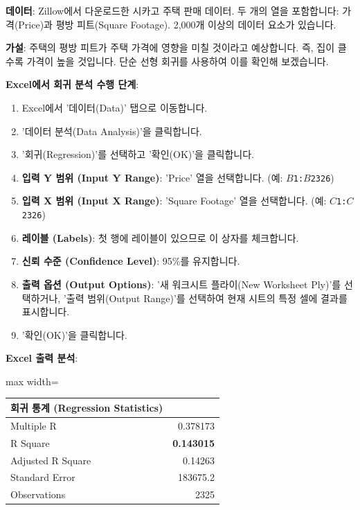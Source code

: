 \documentclass[11pt,a4paper]{article}
\theoremstyle{definition}
\begin{document}
\begin{tcolorbox}[examplebox, title=Excel 실습: Zillow 주택 데이터]
\textbf{데이터}: Zillow에서 다운로드한 시카고 주택 판매 데이터. 두 개의 열을 포함합니다: 가격(Price)과 평방 피트(Square Footage). 2,000개 이상의 데이터 요소가 있습니다.

\textbf{가설}: 주택의 평방 피트가 주택 가격에 영향을 미칠 것이라고 예상합니다. 즉, 집이 클수록 가격이 높을 것입니다. 단순 선형 회귀를 사용하여 이를 확인해 보겠습니다.

\textbf{Excel에서 회귀 분석 수행 단계}:
\begin{enumerate}[label=\arabic*.]
    \item Excel에서 '데이터(Data)' 탭으로 이동합니다.
    \item '데이터 분석(Data Analysis)'을 클릭합니다.
    \item '회귀(Regression)'를 선택하고 '확인(OK)'을 클릭합니다.
    \item \textbf{입력 Y 범위 (Input Y Range)}: 'Price' 열을 선택합니다. (예: \texttt{$B$1:$B$2326})
    \item \textbf{입력 X 범위 (Input X Range)}: 'Square Footage' 열을 선택합니다. (예: \texttt{$C$1:$C$2326})
    \item \textbf{레이블 (Labels)}: 첫 행에 레이블이 있으므로 이 상자를 체크합니다.
    \item \textbf{신뢰 수준 (Confidence Level)}: 95\%를 유지합니다.
    \item \textbf{출력 옵션 (Output Options)}: '새 워크시트 플라이(New Worksheet Ply)'를 선택하거나, '출력 범위(Output Range)'를 선택하여 현재 시트의 특정 셀에 결과를 표시합니다.
    \item '확인(OK)'을 클릭합니다.
\end{enumerate}

\textbf{Excel 출력 분석}:
\begin{adjustbox}{max width=\textwidth}
\begin{tabular}{lr}
\toprule
\textbf{회귀 통계 (Regression Statistics)} & \\
\midrule
Multiple R & 0.378173 \\
R Square & \textbf{0.143015} \\
Adjusted R Square & 0.14263 \\
Standard Error & 183675.2 \\
Observations & 2325 \\
\bottomrule
\end{tabular}
\end{adjustbox}


\end{tcolorbox}
\end{document}
